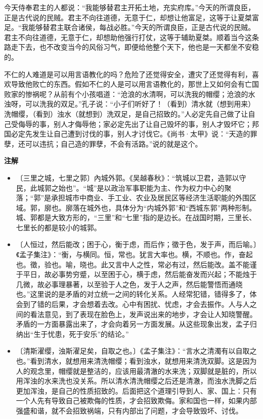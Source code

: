 \documentclass[12pt,UTF-8,openany,a4]{ctexbook}
\begin{document}
\begin{large}
    今天侍奉君主的人都说：“我能够替君主开拓土地，充实府库。”今天的所谓良臣，正是古代说的民贼。君主不向往道德，无意于仁，却想让他富足，这等于让夏桀富足。“我能够替君主联合诸侯，每战必胜。”今天的所谓良臣，正是古代说的民贼。君主不向往道德，无意于仁，却想助他强行打仗，这等于辅助夏桀。顺着当今这条路走下去，也不改变当今的风俗习气，即便给他整个天下，他也是一天都坐不安稳的。
    
    不仁的人难道是可以用言语教化的吗？危险了还觉得安全，遭灾了还觉得有利，喜欢导致他败亡的东西。假如不仁的人是可以用言语教化的，那世上又如何会有亡国败家的惨祸呢？从前有个小孩唱道：“沧浪的水清啊，可以洗我的帽缨；沧浪的水浊呀，可以洗我的双足。”孔子说：“小子们听好了！（看到）清水就（想到用来）洗帽缨，（看到）浊水（就想到）洗双足，是自己招致的。”人必定先自己做了让自己受侮辱的事，别人才侮辱他；家必定先出了让自己毁坏的事，别人才毁坏它；邦国必定先发生让自己遭到讨伐的事，别人才讨伐它。《尚书·太甲》说：“天造的罪孽，还可以违抗；自己造的罪孽，不会有活路。”说的就是这个。
    
\end{large}


\newpage

\begin{Large}
    \noindent\textbf{注解}
\end{Large}


\vspace{-1em}

\begin{itemize}
    \setlength\itemsep{-0.2em}
    \item〔三里之城，七里之郭〕{\yiwen 內城外郭。《吴越春秋》：“筑城以卫君，造郭以守民，此城郭之始也”。“城”是以政治军事职能为主、作为权力中心的聚落；“郭”是承担城市中商业、手工业、农业及居民区等经济生活职能的外围区域。郭，廓也。廓落在城外也，具体分为“内城外郭”和“西城东郭”两种形制。城、郭都是大致方形的，“三里”和“七里”指的是边长。在战国时期，三里长、七里长的都是较小的城郭。}
    \item〔人恒过，然后能改；困于心，衡于虑，而后作；徵于色，发于声，而后喻。〕{\yiwen 《孟子集注》：“衡，与横同。恒，常也。犹言大率也。横，不顺也。作，奋起也。徵，验也。喻，晓也。此又言中人之性，常必有过，然后能改。盖不能谨于平日，故必事势穷蹙，以至困于心，横于虑，然后能奋发而兴起；不能烛于几微，故必事理暴著，以至验于人之色，发于人之声，然后能警悟而通晓也。”这里说的是矛盾的对立统一之间的转化关系。人经常犯错，错得多了，体会到了错的后果，才会想着去改。心中有困扰、忧虑，才会去振作。人与人之间的看法意见，到了表现在脸色上，发声说出来的地步，才会让人知晓警醒。矛盾的一方面暴露出来了，才会向着另一方面发展。从这些现象出发，孟子归纳出“生于忧患，死于安乐”的结论。”}
    \item〔清斯濯缨，浊斯濯足矣，自取之也。〕{\yiwen 《孟子集注》：“言水之清濁有以自取之也。”看到清水，就想用来清洗帽缨；看到浊水，就想用来清洗双脚。这是因为人的观念里，帽缨就是整洁的，应该用最清澈的水来洗；双脚就是脏的，所以用浑浊的水来洗也没关系。所以清水清洗帽缨之后还是清澈，而浊水洗脚之后更加浑浊，是自己的性质招致的。后面把这个道理引导到人、家、国上：只有一个人先有导致自己被欺侮的性质，才会招致欺侮。家和国也一样，如果内部强盛和谐，就不会招致祸端，只有内部出了问题，才会导致毁坏、讨伐。}
\end{itemize}
\end{document}
